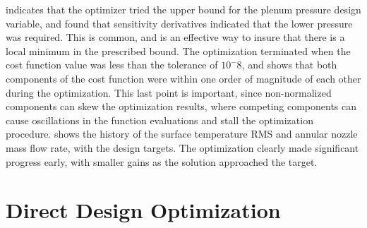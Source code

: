  indicates that the optimizer tried the upper
bound for the plenum pressure design variable, and found that sensitivity
derivatives indicated that the lower pressure was required. This is common, and
is an effective way to insure that there is a local minimum in the prescribed
bound.  The optimization terminated when the cost function value was less than
the tolerance of $10^-8$, and  shows that both
components of the cost function were within one order of magnitude of each other
during the optimization.  This last point is important, since non-normalized
components can skew the optimization results, where competing components can
cause oscillations in the function evaluations and stall the optimization
procedure.   shows the history of the surface
temperature RMS and annular nozzle mass flow rate, with the design targets.  The
optimization clearly made significant progress early, with smaller gains as the
solution approached the target.

\section{Direct Design Optimization}

